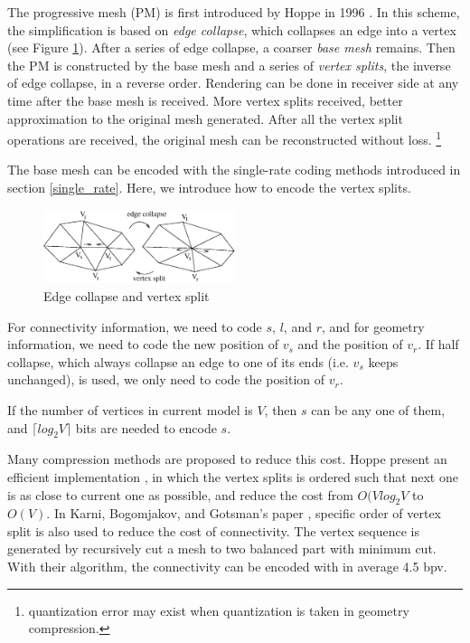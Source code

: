 \documentclass[11pt, a4paper]{report}
\begin{document}
    The progressive mesh (PM) \label{progressive_mesh}is first
    introduced by Hoppe in 1996 \cite{hoppe96progressive}. In this
    scheme, the simplification is based on \emph{edge collapse}, which
    collapses an edge into a vertex (see Figure \ref{split2}).
    After a series of edge collapse, a coarser \emph{base mesh} remains. 
    Then the PM is constructed by the base mesh and a series of \emph{vertex
    splits}, the inverse of edge collapse, in a reverse order.
    Rendering can be done in receiver side at any time after the base
    mesh is received. More vertex splits received, better
    approximation to the original mesh generated. After all
    the vertex split operations are received, the original mesh can be
    reconstructed without loss. \footnote{quantization error may exist
    when quantization is taken in geometry compression.}

    The base mesh can be encoded with the single-rate coding methods
    introduced in section \ref{single_rate}. Here, we introduce
    how to encode the vertex splits. 
\begin{figure}
\centering
\includegraphics[width=0.5\textwidth]{split2.eps}
\caption{Edge collapse and vertex split}\label{split2}
\end{figure}
    For connectivity
    information, we need to code $s$, $l$, and $r$, and for geometry
    information, we need to code the new position of $v_{s}$ and the
    position of $v_{r}$. If half collapse, which always collapse an
    edge to one of its ends (i.e. $v_{s}$ keeps unchanged), is used, 
    we only need to code the position of $v_r$. 
    
    If the number of vertices in current model is
    $V$, then $s$ can be any one of them, 
    and ${\lceil}log_{2}V{\rceil}$ bits are needed to encode $s$. 
    
    Many compression methods are proposed to reduce this cost.
    Hoppe \cite{efficient:hoppe} present an efficient implementation
    , in which the vertex splits is ordered such that next one
    is as close to current one as possible, and reduce the cost
    from $O(Vlog_{2}V$ to $O(V)$.
    In Karni, Bogomjakov, and Gotsman's paper \cite{602153}, 
    specific order of vertex split is also used to reduce the cost of connectivity. 
    The vertex sequence is generated by recursively cut a mesh to two
    balanced part with minimum cut. With their algorithm, the connectivity can
    be encoded with in average 4.5 bpv. 
\end{document}
